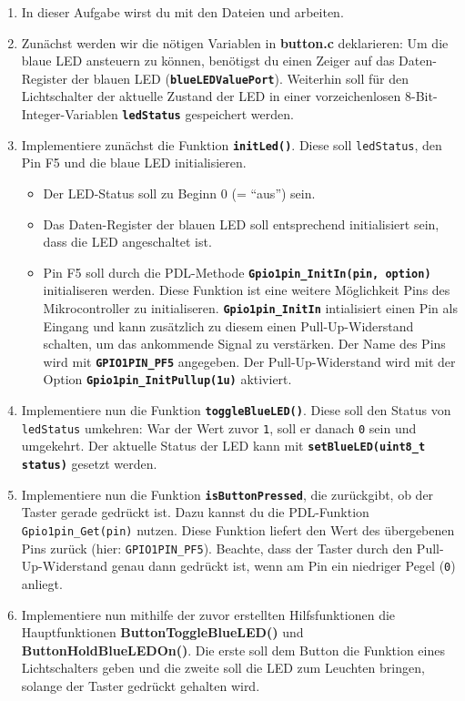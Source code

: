 \begin{enumerate}
\item 
In dieser Aufgabe wirst du mit den Dateien  und  arbeiten.

\item 
Zunächst werden wir die nötigen Variablen in \textbf{button.c} deklarieren:
Um die blaue LED ansteuern zu können, benötigst du einen Zeiger auf das Daten-Register der blauen LED (\textbf{\lstinline|blueLEDValuePort|}).
Weiterhin soll für den Lichtschalter der aktuelle Zustand der LED in einer vorzeichenlosen 8-Bit-Integer-Variablen \textbf{\lstinline|ledStatus|} gespeichert werden.

\item
Implementiere zunächst die Funktion \textbf{\lstinline|initLed()|}.
Diese soll \lstinline|ledStatus|, den Pin F5 und die blaue LED initialisieren.
\begin{itemize}
\item 
Der LED-Status soll zu Beginn 0 (= \enquote{aus}) sein.
\item 
Das Daten-Register der blauen LED soll entsprechend initialisiert sein, dass die LED angeschaltet ist.
\item 
Pin F5 soll durch die PDL-Methode \textbf{\lstinline|Gpio1pin_InitIn(pin, option)|} initialiseren werden.
Diese Funktion ist eine weitere Möglichkeit Pins des Mikrocontroller zu initialiseren. 
\textbf{\lstinline|Gpio1pin_InitIn|} intialisiert einen Pin als Eingang und kann zusätzlich zu diesem einen Pull-Up-Widerstand schalten, um das ankommende Signal zu verstärken.
Der Name des Pins wird mit \textbf{\lstinline|GPIO1PIN_PF5|} angegeben.
Der Pull-Up-Widerstand wird mit der Option \textbf{\lstinline|Gpio1pin_InitPullup(1u)|} aktiviert.
\end{itemize}

\item
Implementiere nun die Funktion \textbf{\lstinline|toggleBlueLED()|}.
Diese soll den Status von \lstinline|ledStatus| umkehren:
War der Wert zuvor \lstinline|1|, soll er danach \lstinline|0| sein und umgekehrt.
Der aktuelle Status der LED kann mit \textbf{\lstinline|setBlueLED(uint8_t status)|} gesetzt werden. 

\item 
Implementiere nun die Funktion \textbf{\lstinline|isButtonPressed|}, die zurückgibt, ob der Taster gerade gedrückt ist.
Dazu kannst du die PDL-Funktion \lstinline|Gpio1pin_Get(pin)| nutzen.
Diese Funktion liefert den Wert des übergebenen Pins zurück (hier: \lstinline|GPIO1PIN_PF5|).
Beachte, dass der Taster durch den Pull-Up-Widerstand genau dann gedrückt ist, wenn am Pin ein niedriger Pegel (\lstinline|0|) anliegt.

\item
Implementiere nun mithilfe der zuvor erstellten Hilfsfunktionen die Hauptfunktionen \textbf{ButtonToggleBlueLED()} und \textbf{ButtonHoldBlueLEDOn()}.
Die erste soll dem Button die Funktion eines Lichtschalters geben und die zweite soll die LED zum Leuchten bringen, solange der Taster gedrückt gehalten wird. 

\end{enumerate}
